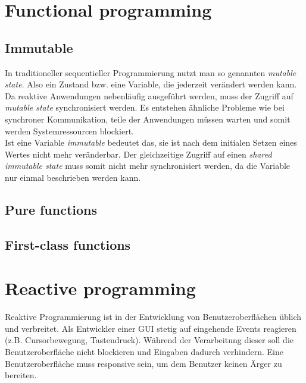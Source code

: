 \section{Functional programming}

\subsection{Immutable}
In traditioneller sequentieller Programmierung nutzt man so genannten \textit{mutable state}. Also ein Zustand bzw. eine Variable, die jederzeit verändert werden kann. Da reaktive Anwendungen nebenläufig ausgeführt werden, muss der Zugriff auf \textit{mutable state} synchronisiert werden. Es entstehen ähnliche Probleme wie bei synchroner Kommunikation, teile der Anwendungen müssen warten und somit werden Systemressourcen blockiert.\\
Ist eine Variable \textit{immutable} bedeutet das, sie ist nach dem initialen Setzen eines Wertes nicht mehr veränderbar. Der gleichzeitige Zugriff auf einen \textit{shared immutable state} muss somit nicht mehr synchronisiert werden, da die Variable nur einmal beschrieben werden kann.

\subsection{Pure functions}

\subsection{First-class functions}


\section{Reactive programming}
Reaktive Programmierung ist in der Entwicklung von Benutzeroberflächen üblich und verbreitet. Als Entwickler einer GUI stetig auf eingehende Events reagieren (z.B. Cursorbewegung, Tastendruck). Während der Verarbeitung dieser soll die Benutzeroberfläche nicht blockieren und Eingaben dadurch verhindern. Eine Benutzeroberfläche muss responsive sein, um dem Benutzer keinen Ärger zu bereiten.\\

